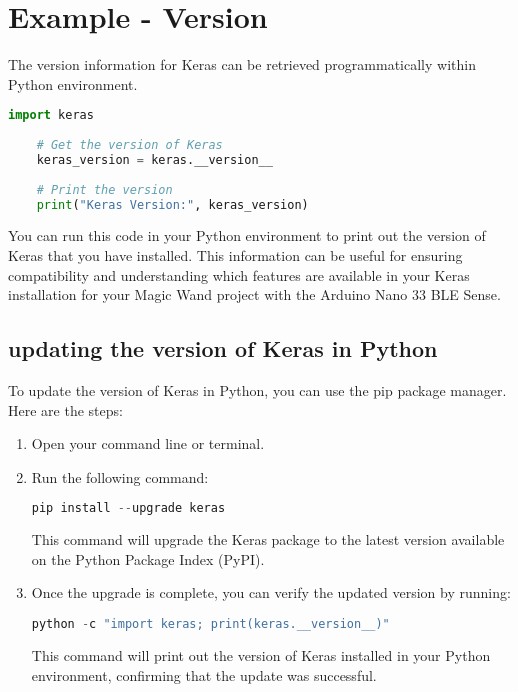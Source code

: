 	\section{Example - Version}
	The version information for Keras can be retrieved programmatically within Python environment.
	
\begin{lstlisting}[language=Python, caption={Getting the version of Keras}, label={code:keras-version}, style=pythonstyle]
	import keras
	
	# Get the version of Keras
	keras_version = keras.__version__
	
	# Print the version
	print("Keras Version:", keras_version)
\end{lstlisting}
	
	You can run this code in your Python environment to print out the version of Keras that you have installed. This information can be useful for ensuring compatibility and understanding which features are available in your Keras installation for your Magic Wand project with the Arduino Nano 33 BLE Sense.\cite{Keras:2024}
	
	
	\subsection{updating the version of Keras in Python}
	
	To update the version of Keras in Python, you can use the pip package manager. Here are the steps:
	
	
	\begin{enumerate}
		\item Open your command line or terminal.
		\item Run the following command:
		
		
		
	\begin{lstlisting}[language=Python, caption={Upgrading Keras using pip}, label={code:upgrade-keras}, style=pythonstyle]
		pip install --upgrade keras
	\end{lstlisting}
		
		
		This command will upgrade the Keras package to the latest version available on the Python Package Index (PyPI).
		
		\item Once the upgrade is complete, you can verify the updated version by running:
		
	\begin{lstlisting}[language=Python, caption={Check the version of Keras using Python}, label={code:check-keras-version}, style=pythonstyle]
		python -c "import keras; print(keras.__version__)"
	\end{lstlisting}
		
		
		This command will print out the version of Keras installed in your Python environment, confirming that the update was successful.
	\end{enumerate}
	
